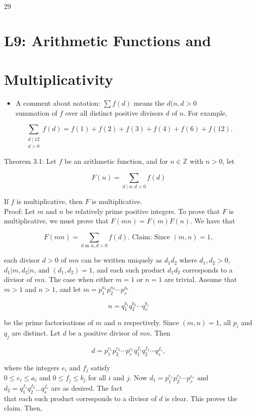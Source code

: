 \documentclass[10pt]{article}
\begin{document}
$29$

\section*{L9: Arithmetic Functions and}
\section*{Multiplicativity}
\begin{itemize}
  \item A comment about notation: $\sum f(d)$ means the $d(n, d>0$\\
summation of $f$ over all distinct positive divisors $d$ of $n$. For example,
\end{itemize}

$$
\sum_{\substack{d \mid 12 \\ d>0}} f(d)=f(1)+f(2)+f(3)+f(4)+f(6)+f(12) .
$$

Theorem 3.1: Let $f$ be an arithmetic function, and for $n \in \mathbb{Z}$ with $n>0$, let

$$
F(n)=\sum_{d \mid n, d>0} f(d)
$$

If $f$ is multiplicative, then $F$ is multiplicative.\\
Proof: Let $m$ and $n$ be relatively prime positive integers. To prove that $F$ is multiplicative, we must prove that $F(m n)=F(m) F(n)$. We have that

$$
F(m n)=\sum_{d \text { m } n, d>0} f(d) \text {. Claim: Since }(m, n)=1,
$$

each divisor $d>0$ of $m n$ can be written uniquely as $d_{1} d_{2}$ where $d_{1}, d_{2}>0$, $d_{1}\left|m, d_{2}\right| n$, and $\left(d_{1}, d_{2}\right)=1$, and each such product $d_{1} d_{2}$ corresponds to a divisor of $m n$. The case when either $m=1$ or $n=1$ are trivial. Assume that $m>1$ and $n>1$, and let $m=p_{1}^{a_{1}} p_{2}^{a_{2}} \cdots p_{r}^{a_{r}}$

$$
n=q_{1}^{b_{1}} q_{2}^{b_{2}} \cdots q_{s}^{b_{s}}
$$

be the prime factorisations of $m$ and $n$ respectively. Since $(m, n)=1$, all $p_{i}$ and $q_{j}$ are distinct. Let $d$ be a positive divisor of $m n$. Then

$$
d=p_{1}^{e_{1}} p_{2}^{e_{2}} \cdots p_{r}^{e_{r}} q_{1}^{f_{1}} q_{2}^{f_{2}} \cdots q_{s}^{f_{s}},
$$

where the integers $e_{i}$ and $f_{j}$ satisfy\\
$0 \leqslant e_{i} \leqslant a_{i}$ and $0 \leqslant f_{j} \leqslant b_{j}$ for all $i$ and $j$. Now $d_{1}=p_{1}^{e_{1}} p_{2}^{e_{2}} \cdots p_{r}^{e_{r}}$ and $d_{2}=q_{1}^{f_{1}} q_{2}^{f_{2}} \ldots q_{s}^{f_{s}}$ are as desired. The fact\\
that each such product corresponds to a divisor of $d$ is clear. This proves the claim. Then,
\end{document}
